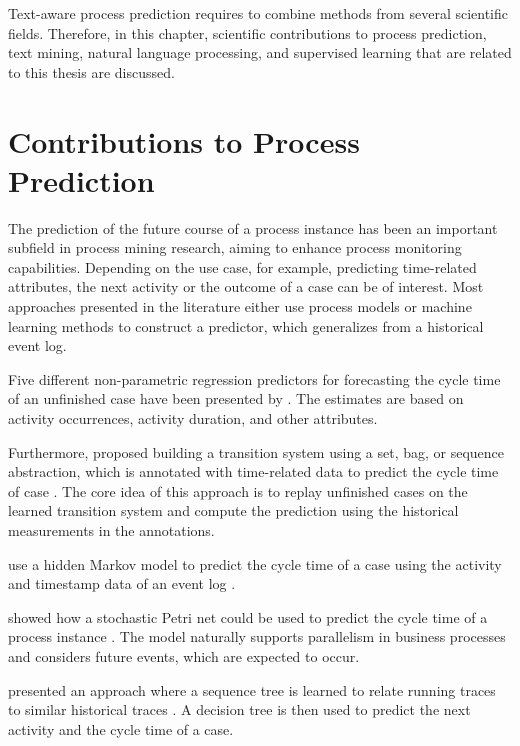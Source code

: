 
Text-aware process prediction requires to combine methods from several scientific fields.
Therefore, in this chapter, scientific contributions to process prediction, text mining, natural language processing, and supervised learning that are related to this thesis are discussed.

\section{Contributions to Process Prediction}

The prediction of the future course of a process instance has been an important subfield in process mining research, aiming to enhance process monitoring capabilities.
Depending on the use case, for example, predicting time-related attributes, the next activity or the outcome of a case can be of interest.
Most approaches presented in the literature either use process models or machine learning methods to construct a predictor, which generalizes from a historical event log.

Five different non-parametric regression predictors for forecasting the cycle time of an unfinished case have been presented by  \cite{DBLP:conf/otm/DongenCA08}.
The estimates are based on activity occurrences, activity duration, and other attributes.

Furthermore,  proposed building a transition system using a set, bag, or sequence abstraction, which is annotated with time-related data to predict the cycle time of case \cite{DBLP:journals/is/AalstSS11}.
The core idea of this approach is to replay unfinished cases on the learned transition system and compute the prediction using the historical measurements in the annotations.

\citeauthor{DBLP:conf/colcom/PandeyNC11} use a hidden Markov model to predict the cycle time of a case using the activity and timestamp data of an event log \cite{DBLP:conf/colcom/PandeyNC11}.

\citeauthor{DBLP:conf/icsoc/Rogge-SoltiW13} showed how a stochastic Petri net could be used to predict the cycle time of a process instance \cite{DBLP:conf/icsoc/Rogge-SoltiW13}.
The model naturally supports parallelism in business processes and considers future events, which are expected to occur. 

\citeauthor{DBLP:conf/dis/CeciLFCM14} presented an approach where a sequence tree is learned to relate running traces to similar historical traces \cite{DBLP:conf/dis/CeciLFCM14}.
A decision tree is then used to predict the next activity and the cycle time of a case.

